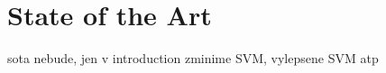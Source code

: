 \section{State of the Art}
\label{sec:sota}
sota nebude, jen v introduction zminime SVM, vylepsene SVM atp
